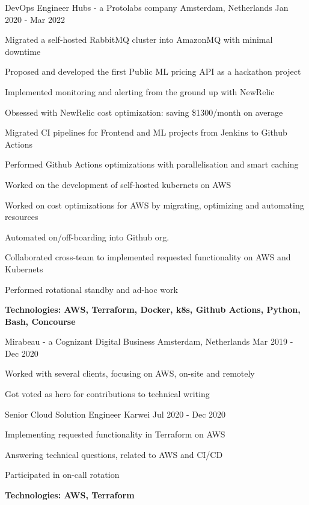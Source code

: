 \begin{cventries}
\cventry
{DevOps Engineer} %
{Hubs - a Protolabs company} %
{Amsterdam, Netherlands} %
{Jan 2020 - Mar 2022} %
{ %
	\begin{cvitems}
		\item {Migrated a self-hosted RabbitMQ cluster into AmazonMQ with minimal downtime}
		\item {Proposed and developed the first Public ML pricing API as a hackathon project}
		\item {Implemented monitoring and alerting from the ground up with NewRelic}
		\item {Obsessed with NewRelic cost optimization: saving \$1300/month on average}
		\item {Migrated CI pipelines for Frontend and ML projects from Jenkins to Github Actions}
		\item {Performed Github Actions optimizations with parallelisation and smart caching}
		\item {Worked on the development of self-hosted kubernets on AWS}
		\item {Worked on cost optimizations for AWS by migrating, optimizing and automating resources}
		\item {Automated on/off-boarding into Github org.}
		\item {Collaborated cross-team to implemented requested functionality on AWS and Kubernets}
		\item {Performed rotational standby and ad-hoc work}
		\item {\bfseries{Technologies:} AWS, Terraform, Docker, k8s, Github Actions, Python, Bash, Concourse}
	\end{cvitems}
}


{Mirabeau - a Cognizant Digital Business}
{Amsterdam, Netherlands}
{Mar 2019 - Dec 2020}
{
	\begin{cvitems}
		\item {Worked with several clients, focusing on AWS, on-site and remotely}
		\item {Got voted as hero for contributions to technical writing}
	\end{cvitems}
}

\hfill\begin{minipage}{\dimexpr\textwidth-1cm}
\xdef\tpd{\the\prevdepth}
\begin{cventrystack}
	\cventry
	{Senior Cloud Solution Engineer} %
	{Karwei} %
	{} %
	{Jul 2020 - Dec 2020} %
	{
		\begin{cvitems}
			\item {Implementing requested functionality in Terraform on AWS}
			\item {Answering technical questions, related to AWS and CI/CD}
			\item {Participated in on-call rotation}
			\item {\bfseries{Technologies:} AWS, Terraform}
		\end{cvitems}
	}


\end{cventrystack}
\end{minipage}
\end{cventries}

